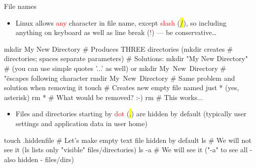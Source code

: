 \documentclass[compress, ucs, xelatex, 11pt, xcolor=svgnames,
  hyperref={
    bookmarks=true,
    unicode=true,
    colorlinks=true,
    pdftitle={Linux, command line and MetaCentrum},
    plainpages=false,
    pdfauthor={Vojtech Zeisek},
    pdfsubject={Course about use of Linux command line, writing shell scripts and using MetaCentrum of CESNET},
    pdfcreator={XeLaTeX},
    pdfkeywords={Linux, GNU, BASH, shell, command line, MetaCentrum},
    linkcolor=DarkRed,
    anchorcolor=DarkBlue,
    citecolor=Indigo,
    filecolor=NavyBlue,
    menucolor=DarkMagenta,
    urlcolor=DarkBlue,
    pdftex},
  url={hyphens, lowtilde} %
  ]{beamer}
\renewcommand{\texttt}[1]{\hl{\ttfamily #1}}
\renewcommand{\alert}[1]{\textcolor{red}{#1}}
\begin{document}
\begin{frame}[fragile]{File names}
  \begin{itemize}
    \item Linux allows \alert{any} character in file name, except \alert{slash} (\texttt{/}), so including anything on keyboard as well as line break (\alert{!}) --- be conservative\ldots
  \end{itemize}
  \begin{bashcode}
    mkdir My New Directory # Produces THREE directories (mkdir creates
                           # directories; spaces separate parameters)
                           # Solutions:
    mkdir "My New Directory" # (you can use simple quotes '...' as well) or
    mkdir My\ New\ Directory # "\" escapes following character
    rmdir My\ New\ Directory # Same problem and solution when removing it
    touch \* # Creates new empty file named just * (yes, asterisk)
    rm * # What would be removed? :-)
    rm \* # This works...
  \end{bashcode}
  \begin{itemize}
    \item Files and directories starting by \alert{dot} (\texttt{.}) are hidden by default (typically user settings and application data in user home)
  \end{itemize}
  \begin{bashcode}
    touch .hiddenfile # Let's make empty text file hidden by default
    ls # We will not see it (ls lists only "visible" files/directories)
    ls -a # We will see it ("-a" to see all - also hidden - files/dirs)
  \end{bashcode}
\end{frame}
\end{document}
